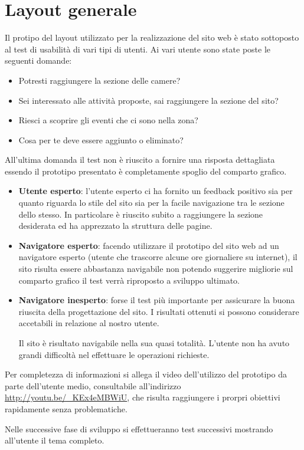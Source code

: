 \documentclass[a4paper,12pt,hidelinks]{report}
\begin{document}
\section*{Layout generale}
Il protipo del layout utilizzato per la realizzazione del sito web è stato sottoposto al test di usabilità di vari tipi di utenti.
Ai vari utente sono state poste le seguenti domande:
\begin{itemize}
 \item Potresti raggiungere la sezione delle camere?
 \item Sei interessato alle attività proposte, sai raggiungere la sezione del sito?
 \item Riesci a scoprire gli eventi che ci sono nella zona?
 \item Cosa per te deve essere aggiunto o eliminato?
\end{itemize}
All'ultima domanda il test non è riuscito a fornire una risposta dettagliata essendo il prototipo presentato è completamente spoglio del comparto grafico.

\begin{itemize}
 \item \textbf{Utente esperto}: l'utente esperto ci ha fornito un feedback positivo sia per quanto riguarda lo stile del sito sia per la facile navigazione tra le sezione
 dello stesso. In particolare è riuscito subito a raggiungere la sezione desiderata ed ha apprezzato la struttura delle pagine.
 \item \textbf{Navigatore esperto}: facendo utilizzare il prototipo del sito web ad un navigatore esperto (utente che trascorre alcune ore giornaliere su internet), il sito 
 risulta essere abbastanza navigabile non potendo suggerire migliorie sul comparto grafico il test verrà riproposto a sviluppo ultimato.
 \item \textbf{Navigatore inesperto}: forse il test più importante per assicurare la buona riuscita della progettazione del sito. I risultati ottenuti si possono considerare 
 accetabili in relazione al nostro utente. 
 \par Il sito è risultato navigabile nella sua quasi totalità. L'utente non ha avuto grandi difficoltà nel effettuare le operazioni richieste.
\end{itemize}
Per completezza di informazioni si allega il video dell'utilizzo del prototipo da parte dell'utente medio, consultabile all'indirizzo \url{http://youtu.be/_KEx4eMBWiU}, che risulta raggiungere i prorpri obiettivi rapidamente senza 
problematiche.
\par Nelle successive fase di sviluppo si effettueranno test successivi mostrando all'utente il tema completo.
\end{document}
